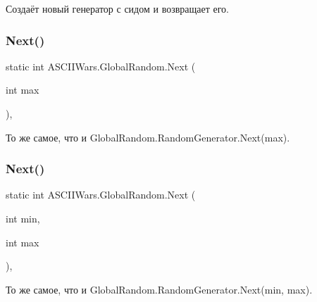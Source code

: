 Создаёт новый генератор с сидом и возвращает его. 

\hypertarget{class_a_s_c_i_i_wars_1_1_global_random_a64f8803c3b01fc0971feac020deaa8c6}{}\label{class_a_s_c_i_i_wars_1_1_global_random_a64f8803c3b01fc0971feac020deaa8c6} 
\subsubsection{\texorpdfstring{Next()}{Next()}\hspace{0.1cm}{\footnotesize\ttfamily [1/2]}}
{\footnotesize\ttfamily static int A\+S\+C\+I\+I\+Wars.\+Global\+Random.\+Next (\begin{DoxyParamCaption}\item[{int}]{max }\end{DoxyParamCaption})\hspace{0.3cm}{\ttfamily [inline]}, {\ttfamily [static]}}



То же самое, что и {\ttfamily Global\+Random.\+Random\+Generator.\+Next(max)}. 

\hypertarget{class_a_s_c_i_i_wars_1_1_global_random_af84b17383838baa18d8c1d070d26e6c5}{}\label{class_a_s_c_i_i_wars_1_1_global_random_af84b17383838baa18d8c1d070d26e6c5} 
\subsubsection{\texorpdfstring{Next()}{Next()}\hspace{0.1cm}{\footnotesize\ttfamily [2/2]}}
{\footnotesize\ttfamily static int A\+S\+C\+I\+I\+Wars.\+Global\+Random.\+Next (\begin{DoxyParamCaption}\item[{int}]{min,  }\item[{int}]{max }\end{DoxyParamCaption})\hspace{0.3cm}{\ttfamily [inline]}, {\ttfamily [static]}}



То же самое, что и {\ttfamily Global\+Random.\+Random\+Generator.\+Next(min, max)}. 



